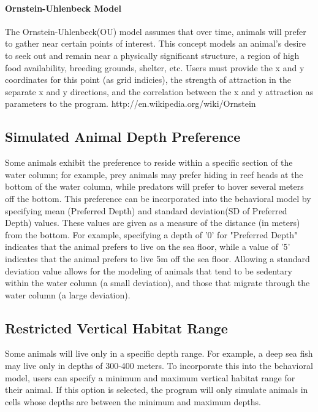 \paragraph{Ornstein-Uhlenbeck Model}
The Ornstein-Uhlenbeck(OU) model assumes that over time, animals will prefer to gather near certain points of interest.  This concept models an animal's desire to seek out and remain near a physically significant structure, a region of high food availability, breeding grounds, shelter, etc.  Users must provide the x and y coordinates for this point (as grid indicies), the strength of attraction in the separate x and y directions, and the correlation between the x and y attraction as parameters to the program.  
 http://en.wikipedia.org/wiki/Ornstein%


\subsection{Simulated Animal Depth Preference}
Some animals exhibit the preference to reside within a specific section of the water column; for example, prey animals may prefer hiding in reef heads at the bottom of the water column, while predators will prefer to hover several meters off the bottom.  This preference can be incorporated into the behavioral model by specifying mean (Preferred Depth) and standard deviation(SD of Preferred Depth) values.  These values are given as a measure of the distance (in meters) from the bottom.  For example, specifying a depth of '0' for "Preferred Depth" indicates that the animal prefers to live on the sea floor, while a value of '5' indicates that the animal prefers to live 5m off the sea floor.  Allowing a standard deviation value allows for the modeling of animals that tend to be sedentary within the water column (a small deviation), and those that migrate through the water column (a large deviation).

\subsection{Restricted Vertical Habitat Range}
Some animals will live only in a specific depth range.  For example, a deep sea fish may live only in depths of 300-400 meters.  To incorporate this into the behavioral model, users can specify a minimum and maximum vertical habitat range for their animal.  If this option is selected, the program will only simulate animals in cells whose depths are between the minimum and maximum depths.  


